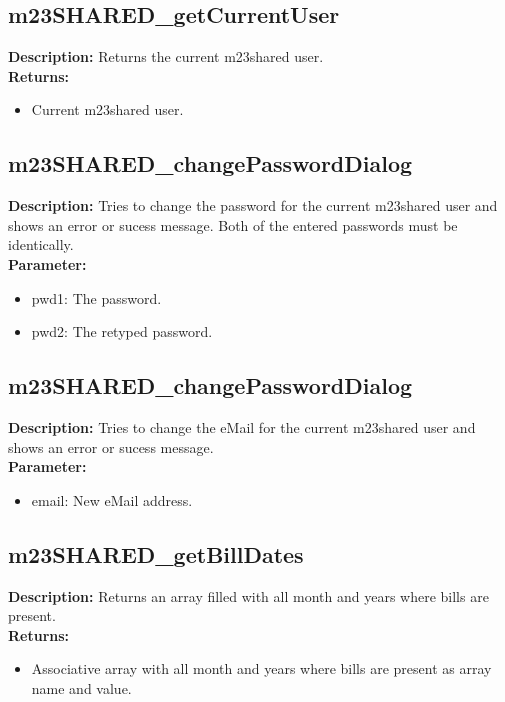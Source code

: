\subsection{m23SHARED\_getCurrentUser}
\textbf{Description:} Returns the current m23shared user.\\
\textbf{Returns:}
\begin{itemize}
\item Current m23shared user.
\end{itemize}

\subsection{m23SHARED\_changePasswordDialog}
\textbf{Description:} Tries to change the password for the current m23shared user and shows an error or sucess message. Both of the entered passwords must be identically.\\
\textbf{Parameter:}
\begin{itemize}
\item pwd1: The password.
\item pwd2: The retyped password.
\end{itemize}

\subsection{m23SHARED\_changePasswordDialog}
\textbf{Description:} Tries to change the eMail for the current m23shared user and shows an error or sucess message.\\
\textbf{Parameter:}
\begin{itemize}
\item email: New eMail address.
\end{itemize}

\subsection{m23SHARED\_getBillDates}
\textbf{Description:} Returns an array filled with all month and years where bills are present.\\
\textbf{Returns:}
\begin{itemize}
\item Associative array with all month and years where bills are present as array name and value.
\end{itemize}


